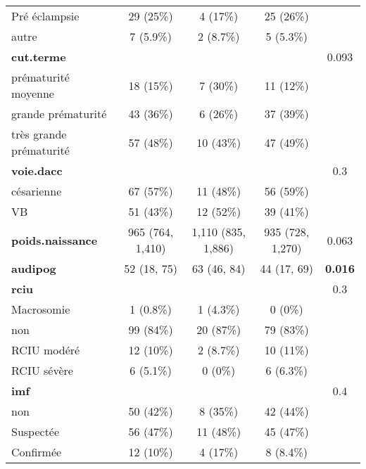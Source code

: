 \documentclass[
  10pt,
  a4paper,
]{scrartcl}
\begin{document}
\begin{longtable}[t]{lcccc}
\hspace{1em}Pré éclampsie & 29 (25\%) & 4 (17\%) & 25 (26\%) & \\
\hspace{1em}autre & 7 (5.9\%) & 2 (8.7\%) & 5 (5.3\%) & \\
\textbf{cut.terme} &  &  &  & 0.093\\
\hspace{1em}prématurité moyenne & 18 (15\%) & 7 (30\%) & 11 (12\%) & \\
\addlinespace
\hspace{1em}grande prématurité & 43 (36\%) & 6 (26\%) & 37 (39\%) & \\
\hspace{1em}très grande prématurité & 57 (48\%) & 10 (43\%) & 47 (49\%) & \\
\textbf{voie.dacc} &  &  &  & 0.3\\
\hspace{1em}césarienne & 67 (57\%) & 11 (48\%) & 56 (59\%) & \\
\hspace{1em}VB & 51 (43\%) & 12 (52\%) & 39 (41\%) & \\
\addlinespace
\textbf{poids.naissance} & 965 (764, 1,410) & 1,110 (835, 1,886) & 935 (728, 1,270) & 0.063\\
\textbf{audipog} & 52 (18, 75) & 63 (46, 84) & 44 (17, 69) & \textbf{0.016}\\
\textbf{rciu} &  &  &  & 0.3\\
\hspace{1em}Macrosomie & 1 (0.8\%) & 1 (4.3\%) & 0 (0\%) & \\
\hspace{1em}non & 99 (84\%) & 20 (87\%) & 79 (83\%) & \\
\addlinespace
\hspace{1em}RCIU modéré & 12 (10\%) & 2 (8.7\%) & 10 (11\%) & \\
\hspace{1em}RCIU sévère & 6 (5.1\%) & 0 (0\%) & 6 (6.3\%) & \\
\textbf{imf} &  &  &  & 0.4\\
\hspace{1em}non & 50 (42\%) & 8 (35\%) & 42 (44\%) & \\
\hspace{1em}Suspectée & 56 (47\%) & 11 (48\%) & 45 (47\%) & \\
\addlinespace
\hspace{1em}Confirmée & 12 (10\%) & 4 (17\%) & 8 (8.4\%) & \\

\end{longtable}
\end{document}
